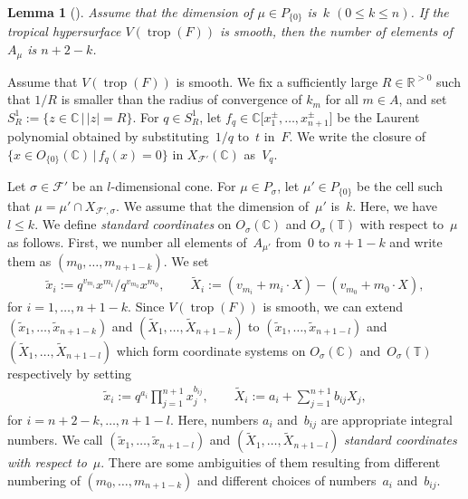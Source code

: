 \documentclass[pdftex]{sigma}
\numberwithin{equation}{section}
\newtheorem{Lemma}[Theorem]{Lemma}
\begin{document}
\begin{Lemma}[] Assume that the dimension of $\mu \in P_{\{0\}}$ is~$k$ $(0 \leq k \leq n)$. If the tropical hypersurface $V(\operatorname{trop}(F))$ is smooth, then the number of elements of $A_\mu$ is $n+2-k$.
\end{Lemma}

Assume that $V(\operatorname{trop}(F))$ is smooth. We f\/ix a suf\/f\/iciently large $R \in {\mathbb R}^{>0}$ such that $1/R$ is smaller than the radius of convergence of $k_m$ for all $m \in A$, and set $S_R^1 := \{ z \in {\mathbb C} \,|\, |z|=R \}$. For $q \in S_R^1$, let $f_q \in {\mathbb C}\big[x^\pm_{1}, \dots,x^\pm_{n+1}\big]$ be the Laurent polynomial obtained by substituting~$1/q$ to~$t$ in~$F$. We write the closure of $\big\{ x \in O_{\{0\}}({\mathbb C}) \,|\, f_q(x)=0 \big\}$ in $X_{{\mathcal F}'}({\mathbb C})$ as~$V_q$.

Let $\sigma \in {\mathcal F}'$ be an $l$-dimensional cone. For $\mu \in P_\sigma$, let $\mu' \in P_{\{0\}}$ be the cell such that $\mu = \mu' \cap X_{{\mathcal F}',\sigma}$. We assume that the dimension of~$\mu'$ is~$k$. Here, we have $l \leq k$. We def\/ine \textit{standard coordinates} on $O_\sigma({\mathbb C})$ and $O_\sigma({\mathbb T})$ with respect to~$\mu$ as follows. First, we number all elements of~$A_{\mu'}$ from~$0$ to $n+1-k$ and write them as $(m_0, \dots, m_{n+1-k})$. We set
\begin{gather*}%
\tilde{x}_i:=q^{v_{m_i}}x^{m_i}/q^{v_{m_0}}x^{m_0},\qquad \widetilde{X}_i :=(v_{m_{i}}+{m_i} \cdot X)-(v_{m_{0}}+{m_0} \cdot X),
\end{gather*}
for $i=1,\dots, n+1-k$. Since $V(\operatorname{trop}(F))$ is smooth, we can extend $(\tilde{x}_1, \dots, \tilde{x}_{n+1-k})$ and $(\widetilde{X}_1, \dots, \widetilde{X}_{n+1-k})$ to $(\tilde{x}_1, \dots, \tilde{x}_{n+1-l})$ and $(\widetilde{X}_1, \dots, \widetilde{X}_{n+1-l})$ which form coordinate systems on $O_\sigma({\mathbb C})$ and~$O_\sigma({\mathbb T})$ respectively by setting
\begin{gather*}
\tilde{x}_i :=q^{a_i} \prod_{j=1}^{n+1}x_j^{b_{ij}},\qquad \widetilde{X}_i :=a_i+\sum_{j=1}^{n+1} b_{ij}X_j,
\end{gather*}
for $i=n+2-k,\dots, n+1-l$. Here, numbers $a_i$ and~$b_{ij}$ are appropriate integral numbers. We call $(\tilde{x}_1, \dots, \tilde{x}_{n+1-l})$ and $(\widetilde{X}_1, \dots, \widetilde{X}_{n+1-l})$ \textit{standard coordinates with respect to}~$\mu$. There are some ambiguities of them resulting from dif\/ferent numbering of $(m_0, \dots, m_{n+1-k})$ and dif\/ferent choices of numbers~$a_i$ and~$b_{ij}$.
\end{document}
